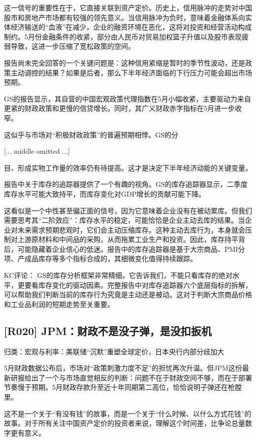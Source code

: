 \documentclass[11pt]{ctexart}
\begin{document}
这一信号的重要性在于，它直接关联到资产定价。历史上，信用脉冲的走势对中国股市和房地产市场都有较强的领先意义。当信用脉冲为负时，意味着金融体系向实体经济输送的“血液”在减少，企业的融资环境在恶化，这将对投资和经营活动构成制约。5月份金融条件的收紧，部分由人民币对贸易加权篮子升值以及股市表现疲弱导致，这进一步压缩了宽松政策的空间。

报告尚未完全回答的一个关键问题是：这种信用紧缩是暂时的季节性波动，还是政策主动调控的结果？如果是后者，那么下半年经济面临的下行压力可能会超出市场预期。

GS的报告显示，其自营的中国宏观政策代理指数在5月小幅收紧，主要驱动力来自更紧的财政政策和更慢的信贷增长。同时，其广义财政赤字指标在5月进一步收窄。

这似乎与市场对“积极财政政策”的普遍预期相悖。GS的分

[... middle omitted ...]

目、形成实物工作量的效率仍有待提高。这才是决定下半年经济动能的关键变量。

报告中关于库存的追踪器提供了一个有趣的视角。GS的库存追踪器显示，二季度库存水平可能大致持平，而库存变化对GDP增长的贡献可能下降。

这看似是一个中性甚至偏正面的信号，因为它意味着企业没有在被动累库。但我们需要思考其“二阶效应”：库存水平的稳定，可能恰恰是企业主动去库的结果。当企业对未来需求预期悲观时，它们会主动压缩库存。这种主动去库行为，本身就会压制对上游原材料和中间品的采购，从而拖累工业生产和投资。因此，库存持平背后，可能隐藏着企业信心的低迷。报告中的库存追踪器是基于大宗商品、PMI分项、产成品库存等多个指标合成的，其细微变化值得持续跟踪。

KC评论： GS的库存分析框架非常精细。它告诉我们，不能只看库存的绝对水平，更要看库存变化的驱动因素。完整报告中对库存追踪器六个底层指标的拆解，可以帮助我们判断当前的库存行为究竟是主动还是被动。这对于判断大宗商品价格和工业品利润的短期走势至关重要。

\subsection{[R020] JPM：财政不是没子弹，是没扣扳机}
{\small\color{refgray}归类：宏观与利率：美联储“沉默”重塑全球定价，日本央行内部分歧加大}

5月财政数据公布后，市场对“政策刺激力度不足”的担忧再次升温。但JPM这份最新研报给出了一个与市场直觉相反的判断：问题不在于财政空间不够，而在于部署节奏慢于预期。5月财政存款升至近十年同期第二高位，恰恰说明子弹还在枪膛里。

这不是一个关于“有没有钱”的故事，而是一个关于“什么时候、以什么方式花钱”的故事。对于所有关注中国资产定价的投资者来说，理解这个时间差，比争论总量数字更有意义。
\end{document}
